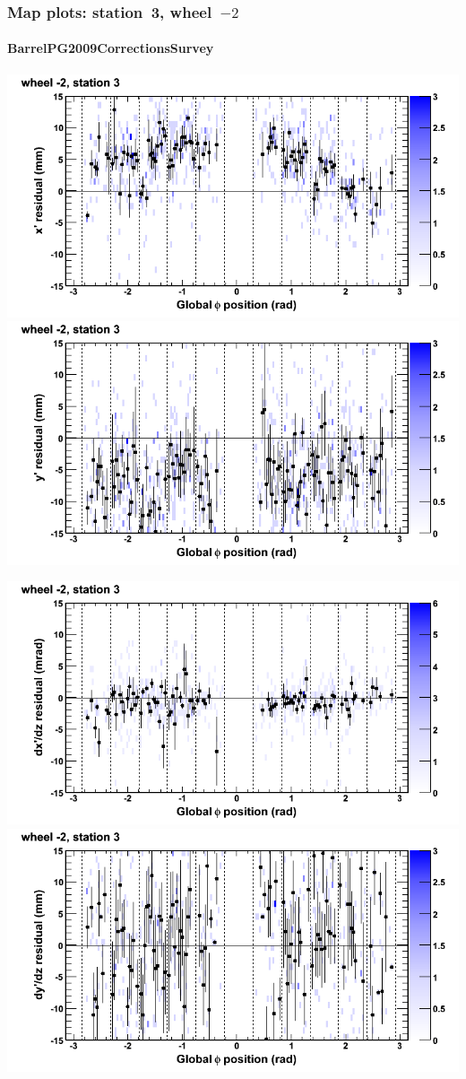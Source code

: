 \documentclass[compress]{beamer}
\begin{document}
\begin{frame}
\frametitle{Map plots: station~3, wheel~$-2$}
\framesubtitle{BarrelPG2009CorrectionsSurvey}
\includegraphics[width=0.5\linewidth]{mapplots_01/DTvsphi_st3whA_x.png}
\includegraphics[width=0.5\linewidth]{mapplots_01/DTvsphi_st3whA_y.png}

\includegraphics[width=0.5\linewidth]{mapplots_01/DTvsphi_st3whA_dxdz.png}
\includegraphics[width=0.5\linewidth]{mapplots_01/DTvsphi_st3whA_dydz.png}
\end{frame}
\end{document}

